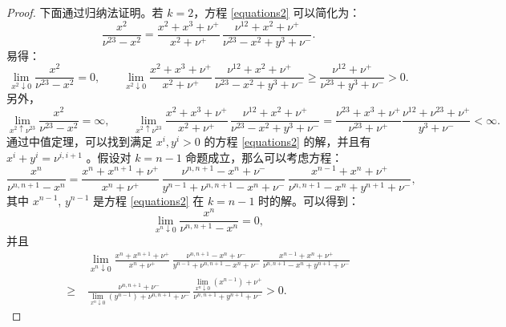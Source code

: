 \begin{appendices}
\begin{proof}
    下面通过归纳法证明。若 $k=2$，方程 \eqref{equations2} 可以简化为：
    \begin{equation*}\label{equation k=2}
        \frac{x^{2}}{\nu^{23}-x^2}
        =\frac{x^{2}+x^{3}+\nu^+}{x^{2}+\nu^+}\, \frac{\nu^{12}+x^{2}+\nu^{+}}{\nu^{23}-x^2+y^3+\nu^-}.
    \end{equation*}
    易得：
    \begin{equation*}
        \lim_{x^{2}\downarrow 0}\frac{x^{2}}{\nu^{23}-x^2} = 0,\qquad \lim_{x^{2}\downarrow 0}\frac{x^{2}+x^{3}+\nu^+}{x^{2}+\nu^+}\, \frac{\nu^{12}+x^{2}+\nu^{+}}{\nu^{23}-x^2+y^3+\nu^-} \ge  \frac{\nu^{12}+\nu^{+}}{\nu^{23}+y^{3}+\nu^-} > 0.
    \end{equation*} 
    另外，
    \begin{equation*}
        \lim_{x^2\uparrow \nu^{23}}\frac{x^{2}}{\nu^{23}-x^2} = \infty,\qquad \lim_{x^{2}\uparrow \nu^{23}}\frac{x^{2}+x^{3}+\nu^+}{x^{2}+\nu^+}\, \frac{\nu^{12}+x^{2}+\nu^{+}}{\nu^{23}-x^2+y^3+\nu^-} =  \frac{\nu^{23}+x^{3}+\nu^+}{\nu^{23}+\nu^+}\frac{\nu^{12}+\nu^{23}+\nu^{+}}{y^{3}+\nu^-} < \infty.
    \end{equation*}
    通过中值定理，可以找到满足 $x^{i},y^i>0$ 的方程 \eqref{equations2} 的解，并且有 $x^{i}+y^{i}=\nu^{i,i+1}$ 。假设对 $k=n-1$ 命题成立，那么可以考虑方程：
    \begin{equation*}
        \frac{x^{n}}{\nu^{n,n+1}-x^{n}} = \frac{x^{n}+x^{n+1}+\nu^+}{x^{n}+\nu^+}\,\frac{\nu^{n,n+1}-x^{n}+\nu^-}{y^{n-1}+\nu^{n,n+1}-x^{n}+\nu^-}\,\frac{x^{n-1}+x^{n}+\nu^+}{\nu^{n,n+1}-x^{n}+y^{n+1}+\nu^-},
    \end{equation*}
    其中 $x^{n-1}$, $y^{n-1}$ 是方程 \eqref{equations2} 在 $k=n-1$ 时的解。可以得到：
    \begin{equation}\label{limit1}
        \lim_{x^{n}\downarrow 0}\frac{x^{n}}{\nu^{n,n+1}-x^{n}}=0,
    \end{equation}
    并且
    \begin{equation}\label{limit2}
        \begin{split}
            &\;\lim_{x^{n}\downarrow 0}\frac{x^{n}+x^{n+1}+\nu^+}{x^{n}+\nu^+}\,\frac{\nu^{n,n+1}-x^{n}+\nu^-}{y^{n-1}+\nu^{n,n+1}-x^{n}+\nu^-}\,\frac{x^{n-1}+x^{n}+\nu^+}{\nu^{n,n+1}-x^{n}+y^{n+1}+\nu^-}\\
            \ge &\;\frac{\nu^{n,n+1}+\nu^-}{\lim_{x^{n}\downarrow 0}(y^{n-1})+\nu^{n,n+1}+\nu^-}\,\frac{\lim_{x^{n}\downarrow 0}(x^{n-1})+\nu^+}{\nu^{n,n+1}+y^{n+1}+\nu^-}>0.
        \end{split}

\end{equation}
\end{proof}
\end{appendices}
